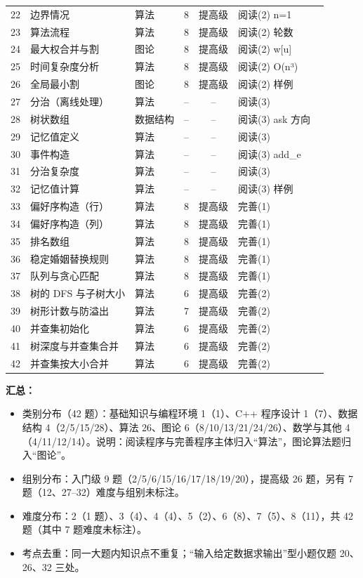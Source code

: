 \documentclass[a4paper]{ctexart}
\begin{document}
\begin{longtable}{cp{2.2cm}p{2.0cm}ccp{5.0cm}}
22  & 边界情况 & 算法 & 8 & 提高级 & 阅读(2) n=1 \ \\
23  & 算法流程 & 算法 & 8 & 提高级 & 阅读(2) 轮数 \ \\
24  & 最大权合并与割 & 图论 & 8 & 提高级 & 阅读(2) w[u] \ \\
25  & 时间复杂度分析 & 算法 & 8 & 提高级 & 阅读(2) O(n³) \ \\
26  & 全局最小割 & 图论 & 8 & 提高级 & 阅读(2) 样例 \ \\
27  & 分治（离线处理） & 算法 & -- & -- & 阅读(3) \ \\
28  & 树状数组 & 数据结构 & -- & -- & 阅读(3) ask 方向 \ \\
29  & 记忆值定义 & 算法 & -- & -- & 阅读(3) \ \\
30  & 事件构造 & 算法 & -- & -- & 阅读(3) add\_e \ \\
31  & 分治复杂度 & 算法 & -- & -- & 阅读(3) \ \\
32  & 记忆值计算 & 算法 & -- & -- & 阅读(3) 样例 \ \\
33  & 偏好序构造（行） & 算法 & 8 & 提高级 & 完善(1) \ \\
34  & 偏好序构造（列） & 算法 & 8 & 提高级 & 完善(1) \ \\
35  & 排名数组 & 算法 & 8 & 提高级 & 完善(1) \ \\
36  & 稳定婚姻替换规则 & 算法 & 8 & 提高级 & 完善(1) \ \\
37  & 队列与贪心匹配 & 算法 & 8 & 提高级 & 完善(1) \ \\
38  & 树的 DFS 与子树大小 & 算法 & 6 & 提高级 & 完善(2) \ \\
39  & 树形计数与防溢出 & 算法 & 7 & 提高级 & 完善(2) \ \\
40  & 并查集初始化 & 算法 & 6 & 提高级 & 完善(2) \ \\
41  & 树深度与并查集合并 & 算法 & 6 & 提高级 & 完善(2) \ \\
42  & 并查集按大小合并 & 算法 & 6 & 提高级 & 完善(2) \ \\
\bottomrule
\end{longtable}
\endgroup

\noindent\textbf{汇总：}
\begin{itemize}[leftmargin=2em, itemsep=1pt]
    \item 类别分布（42 题）：基础知识与编程环境 1（1）、C++ 程序设计 1（7）、数据结构 4（2/5/15/28）、算法 26、图论 6（8/10/13/21/24/26）、数学与其他 4（4/11/12/14）。\quad 说明：阅读程序与完善程序主体归入“算法”，图论算法题归入“图论”。
    \item 组别分布：入门级 9 题（2/5/6/15/16/17/18/19/20），提高级 26 题，另有 7 题（12、27--32）难度与组别未标注。
    \item 难度分布：2（1 题）、3（4）、4（4）、5（2）、6（8）、7（5）、8（11），共 42 题（其中 7 题难度未标注）。
    \item 考点去重：同一大题内知识点不重复；“输入给定数据求输出”型小题仅题 20、26、32 三处。
\end{itemize}
\end{document}
